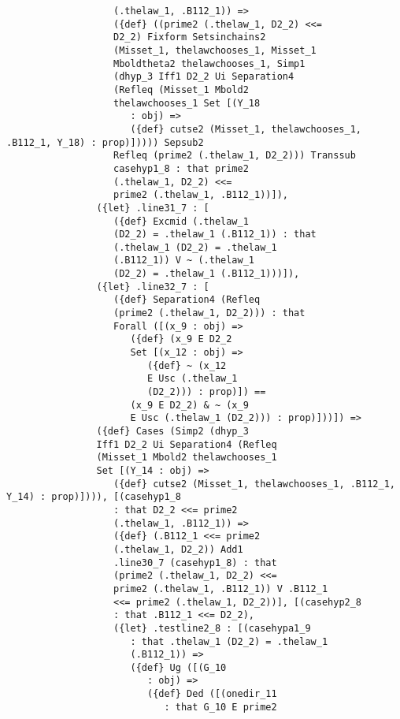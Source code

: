 \documentclass[12pt]{article}
\begin{document}
\begin{verbatim}
                   (.thelaw_1, .B112_1)) => 
                   ({def} ((prime2 (.thelaw_1, D2_2) <<= 
                   D2_2) Fixform Setsinchains2 
                   (Misset_1, thelawchooses_1, Misset_1 
                   Mboldtheta2 thelawchooses_1, Simp1 
                   (dhyp_3 Iff1 D2_2 Ui Separation4 
                   (Refleq (Misset_1 Mbold2 
                   thelawchooses_1 Set [(Y_18 
                      : obj) => 
                      ({def} cutse2 (Misset_1, thelawchooses_1, .B112_1, Y_18) : prop)])))) Sepsub2 
                   Refleq (prime2 (.thelaw_1, D2_2))) Transsub 
                   casehyp1_8 : that prime2 
                   (.thelaw_1, D2_2) <<= 
                   prime2 (.thelaw_1, .B112_1))]), 
                ({let} .line31_7 : [
                   ({def} Excmid (.thelaw_1 
                   (D2_2) = .thelaw_1 (.B112_1)) : that 
                   (.thelaw_1 (D2_2) = .thelaw_1 
                   (.B112_1)) V ~ (.thelaw_1 
                   (D2_2) = .thelaw_1 (.B112_1)))]), 
                ({let} .line32_7 : [
                   ({def} Separation4 (Refleq 
                   (prime2 (.thelaw_1, D2_2))) : that 
                   Forall ([(x_9 : obj) => 
                      ({def} (x_9 E D2_2 
                      Set [(x_12 : obj) => 
                         ({def} ~ (x_12 
                         E Usc (.thelaw_1 
                         (D2_2))) : prop)]) == 
                      (x_9 E D2_2) & ~ (x_9 
                      E Usc (.thelaw_1 (D2_2))) : prop)]))]) => 
                ({def} Cases (Simp2 (dhyp_3 
                Iff1 D2_2 Ui Separation4 (Refleq 
                (Misset_1 Mbold2 thelawchooses_1 
                Set [(Y_14 : obj) => 
                   ({def} cutse2 (Misset_1, thelawchooses_1, .B112_1, Y_14) : prop)]))), [(casehyp1_8 
                   : that D2_2 <<= prime2 
                   (.thelaw_1, .B112_1)) => 
                   ({def} (.B112_1 <<= prime2 
                   (.thelaw_1, D2_2)) Add1 
                   .line30_7 (casehyp1_8) : that 
                   (prime2 (.thelaw_1, D2_2) <<= 
                   prime2 (.thelaw_1, .B112_1)) V .B112_1 
                   <<= prime2 (.thelaw_1, D2_2))], [(casehyp2_8 
                   : that .B112_1 <<= D2_2), 
                   ({let} .testline2_8 : [(casehypa1_9 
                      : that .thelaw_1 (D2_2) = .thelaw_1 
                      (.B112_1)) => 
                      ({def} Ug ([(G_10 
                         : obj) => 
                         ({def} Ded ([(onedir_11 
                            : that G_10 E prime2 

\end{verbatim}
\end{document}
